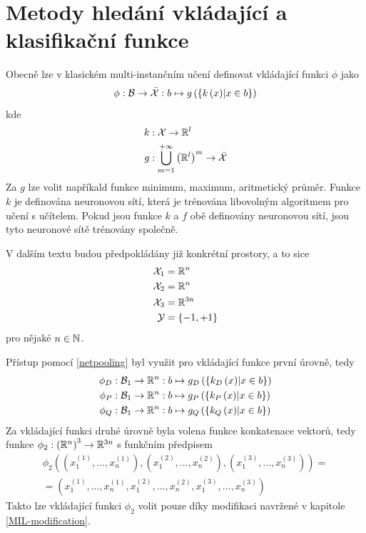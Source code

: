 \section{Metody hledání vkládající a klasifikační funkce}
Obecně lze v klasickém multi-instančním učení definovat vkládající funkci \( \phi \) jako
\begin{equation}\label{netpooling}
	\phi : \mathcal B \to \bar{\mathcal X} : b \mapsto g \left( \left\{ k \left( x \right) \middle| x \in b \right\} \right)
\end{equation}
kde
\begin{align*}
	k &: \mathcal X \to \mathbb R^l \\
	g &: \bigcup_{m = 1}^{+ \infty} \left( \mathbb R^l \right)^m \to \bar{\mathcal X}
\end{align*}
Za \( g \) lze volit napříkald funkce minimum, maximum, aritmetický průměr. Funkce \( k \) je definována neuronovou sítí, která je trénována libovolným algoritmem pro učení s učítelem. Pokud jsou funkce \( k \) a \( f \) obě definovány neuronovou sítí, jsou tyto neuronové sítě trénovány společně.

V dalším textu budou předpokládány již konkrétní prostory, a to sice
\begin{align*}
	\mathcal X_1 &= \mathbb R^n \\
	\mathcal X_2 &= \mathbb R^n \\
	\mathcal X_3 &= \mathbb R^{3n} \\
	\mathcal Y &= \left\{ -1, +1 \right\}
\end{align*}
pro nějaké \( n \in \mathbb N \).

Přístup pomocí \eqref{netpooling} byl využit pro vkládající funkce první úrovně, tedy
\begin{align*}
	\phi_D &: \mathcal B_1 \to \mathbb R^n : b \mapsto g_D \left( \left\{ k_D \left( x \right) \middle| x \in b \right\} \right) \\
	\phi_P &: \mathcal B_1 \to \mathbb R^n : b \mapsto g_P \left( \left\{ k_P \left( x \right) \middle| x \in b \right\} \right) \\
	\phi_Q &: \mathcal B_1 \to \mathbb R^n : b \mapsto g_Q \left( \left\{ k_Q \left( x \right) \middle| x \in b \right\} \right)
\end{align*}
Za vkládající funkci druhé úrovně byla volena funkce konkatenace vektorů, tedy funkce \( \phi_2 : \left( \mathbb R^n \right)^3  \to \mathbb R^{3n} \) s funkčním předpisem
\begin{multline}
	\phi_2 \left( \left( x_1^{(1)}, \dots, x_n^{(1)} \right), \left( x_1^{(2)}, \dots, x_n^{(2)} \right), \left( x_1^{(3)}, \dots, x_n^{(3)} \right) \right) = \\
	= \left( x_1^{(1)}, \dots, x_n^{(1)}, x_1^{(2)}, \dots, x_n^{(2)}, x_1^{(3)}, \dots, x_n^{(3)} \right)
\end{multline}
Takto lze vkládající funkci \( \phi_2 \) volit pouze díky modifikaci navržené v kapitole \ref{MIL-modification}.

